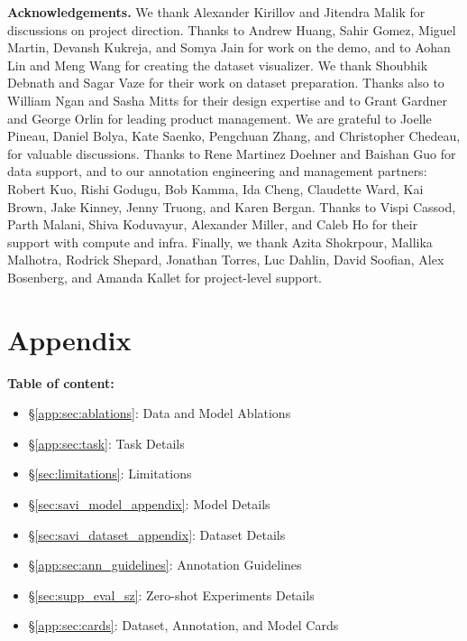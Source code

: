 \documentclass[]{fairmeta}
\renewcommand{\paragraph}[1]{\vspace{1.25mm}\noindent\textbf{#1}}
\renewcommand{\paragraph}[1]{\vspace{1.25mm}\noindent\textbf{#1}}
\begin{document}
\paragraph{Acknowledgements.}
We thank Alexander Kirillov and Jitendra Malik for discussions on project direction. Thanks to Andrew Huang, Sahir Gomez, Miguel Martin, Devansh Kukreja, and Somya Jain for work on the demo, and to Aohan Lin and Meng Wang for creating the dataset visualizer. We thank Shoubhik Debnath and Sagar Vaze for their work on dataset preparation. Thanks also to William Ngan and Sasha Mitts for their design expertise and to Grant Gardner and George Orlin for leading product management. We are grateful to Joelle Pineau, Daniel Bolya, Kate Saenko, Pengchuan Zhang, and Christopher Chedeau, for valuable discussions. Thanks to Rene Martinez Doehner and Baishan Guo for data support, and to our annotation engineering and management partners: Robert Kuo, Rishi Godugu, Bob Kamma, Ida Cheng, Claudette Ward, Kai Brown, Jake Kinney, Jenny Truong, and Karen Bergan. Thanks to Vispi Cassod, Parth Malani, Shiva Koduvayur, Alexander Miller, and Caleb Ho for their support with compute and infra. Finally, we thank Azita Shokrpour, Mallika Malhotra, Rodrick Shepard, Jonathan Torres, Luc Dahlin, David Soofian, Alex Bosenberg, and Amanda Kallet for project-level support.


\clearpage
\appendix

\section*{Appendix}
\label{appendix}
\paragraph{Table of content:}
\begin{itemize}[itemsep=-1pt,topsep=-1pt]
\item \S\ref{app:sec:ablations}: Data and Model Ablations 
\item \S\ref{app:sec:task}: Task Details
\item \S\ref{sec:limitations}: Limitations
\item \S\ref{sec:savi_model_appendix}: Model Details
\item \S\ref{sec:savi_dataset_appendix}: Dataset Details
\item \S\ref{app:sec:ann_guidelines}: Annotation Guidelines
\item \S\ref{sec:supp_eval_sz}: Zero-shot Experiments Details
\item \S\ref{app:sec:cards}: Dataset, Annotation, and Model Cards
\end{itemize}
\end{document}
